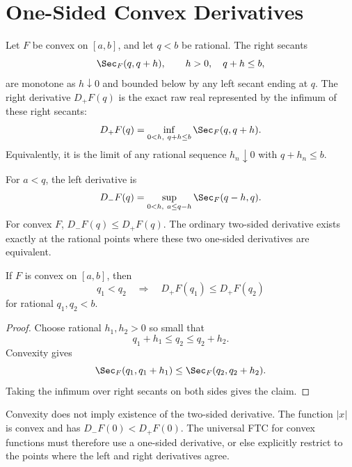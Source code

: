 \section{One-Sided Convex Derivatives}

\begin{definition}
\label{def:convex-right-derivative}
Let \(F\) be convex on \([a,b]\), and let \(q<b\) be rational.  The right
secants
\[
  \Sec_F(q,q+h),\qquad h>0,\quad q+h\le b,
\]
are monotone as \(h\downarrow 0\) and bounded below by any left secant ending
at \(q\).  The right derivative \(D_+F(q)\) is the exact raw real represented
by the infimum of these right secants:
\[
  D_+F(q)=\inf_{0<h,\ q+h\le b}\Sec_F(q,q+h).
\]
Equivalently, it is the limit of any rational sequence \(h_n\downarrow0\)
with \(q+h_n\le b\).
\end{definition}

\begin{definition}
\label{def:convex-left-derivative}
For \(a<q\), the left derivative is
\[
  D_-F(q)=\sup_{0<h,\ a\le q-h}\Sec_F(q-h,q).
\]
For convex \(F\), \(D_-F(q)\le D_+F(q)\).  The ordinary two-sided derivative
exists exactly at the rational points where these two one-sided derivatives
are equivalent.
\end{definition}

\begin{theorem}
\label{thm:convex-right-derivative-increasing}
\leanok
If \(F\) is convex on \([a,b]\), then
\[
  q_1<q_2
  \quad\Longrightarrow\quad
  D_+F(q_1)\le D_+F(q_2)
\]
for rational \(q_1,q_2<b\).
\end{theorem}

\begin{proof}
Choose rational \(h_1,h_2>0\) so small that
\[
  q_1+h_1\le q_2\le q_2+h_2.
\]
Convexity gives
\[
  \Sec_F(q_1,q_1+h_1)\le \Sec_F(q_2,q_2+h_2).
\]
Taking the infimum over right secants on both sides gives the claim.
\end{proof}

\begin{remark}[Corners]\label{rem:convex-corners}
Convexity does not imply existence of the two-sided derivative.  The function
\(|x|\) is convex and has \(D_-F(0)<D_+F(0)\).  The universal FTC for convex
functions must therefore use a one-sided derivative, or else explicitly
restrict to the points where the left and right derivatives agree.
\end{remark}

